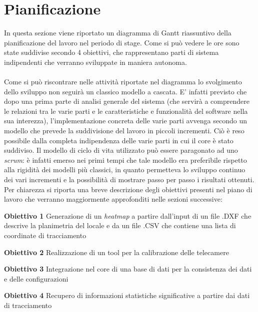\section{Pianificazione} \label{sec:pianificazione}
In questa sezione viene riportato un diagramma di Gantt riassuntivo della pianificazione del lavoro nel periodo di stage. Come si può vedere le ore sono state suddivise secondo 4 obiettivi, che rappresentano parti di sistema indipendenti che verranno sviluppate in maniera autonoma. \\ \\
Come si può riscontrare nelle attività riportate nel diagramma lo svolgimento dello sviluppo non seguirà un classico modello a cascata. E' infatti previsto che dopo una prima parte di analisi generale del sistema (che servirà a comprendere le relazioni tra le varie parti e le caratteristiche e funzionalità del software nella sua interezza), l'implementazione concreta delle varie parti avvenga secondo un modello che prevede la suddivisione del lavoro in piccoli incrementi. Ciò è reso possibile dalla completa indipendenza delle varie parti in cui il core è stato suddiviso. Il modello di ciclo di vita utilizzato può essere paragonato ad uno \textit{scrum}: è infatti emerso nei primi tempi che tale modello era preferibile rispetto alla rigidità dei modelli più classici, in quanto permetteva lo sviluppo continuo dei vari incrementi e la possibilità di mostrare passo per passo i risultati ottenuti. Per chiarezza si riporta una breve descrizione degli obiettivi presenti nel piano di lavoro che verranno maggiormente approfonditi nelle sezioni successive:
\begin{description}
	\item \textbf{Obiettivo 1} Generazione di un \textit{heatmap} a partire dall'input di un file .DXF che descrive la planimetria del locale e da un file .CSV che contiene una lista di coordinate di tracciamento
	\item \textbf{Obiettivo 2} Realizzazione di un tool per la calibrazione delle telecamere
	\item \textbf{Obiettivo 3} Integrazione nel core di una base di dati per la consistenza dei dati e delle configurazioni
	\item \textbf{Obiettivo 4} Recupero di informazioni statistiche significative a partire dai dati di tracciamento
	
\end{description}


